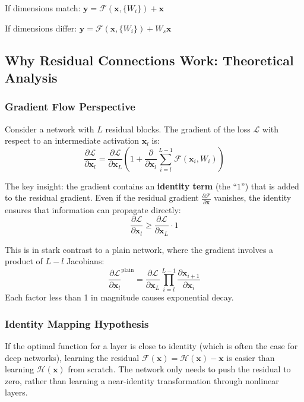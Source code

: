 If dimensions match: $\mathbf{y} = \mathcal{F}(\mathbf{x}, \{W_i\}) + \mathbf{x}$

If dimensions differ: $\mathbf{y} = \mathcal{F}(\mathbf{x}, \{W_i\}) + W_s\mathbf{x}$

\subsection{Why Residual Connections Work: Theoretical Analysis}

\subsubsection{Gradient Flow Perspective}

Consider a network with $L$ residual blocks. The gradient of the loss $\mathcal{L}$ with respect to an intermediate activation $\mathbf{x}_l$ is:
\begin{equation}
\frac{\partial \mathcal{L}}{\partial \mathbf{x}_l} = \frac{\partial \mathcal{L}}{\partial \mathbf{x}_L} \left(1 + \frac{\partial}{\partial \mathbf{x}_l}\sum_{i=l}^{L-1} \mathcal{F}(\mathbf{x}_i, W_i)\right)
\end{equation}

The key insight: the gradient contains an \textbf{identity term} (the ``$1$'') that is added to the residual gradient. Even if the residual gradient $\frac{\partial \mathcal{F}}{\partial \mathbf{x}}$ vanishes, the identity ensures that information can propagate directly:
\begin{equation}
\frac{\partial \mathcal{L}}{\partial \mathbf{x}_l} \geq \frac{\partial \mathcal{L}}{\partial \mathbf{x}_L} \cdot 1
\end{equation}

This is in stark contrast to a plain network, where the gradient involves a product of $L - l$ Jacobians:
\begin{equation}
\frac{\partial \mathcal{L}}{\partial \mathbf{x}_l}^{\text{plain}} = \frac{\partial \mathcal{L}}{\partial \mathbf{x}_L} \prod_{i=l}^{L-1} \frac{\partial \mathbf{x}_{i+1}}{\partial \mathbf{x}_i}
\end{equation}
Each factor less than 1 in magnitude causes exponential decay.

\subsubsection{Identity Mapping Hypothesis}

If the optimal function for a layer is close to identity (which is often the case for deep networks), learning the residual $\mathcal{F}(\mathbf{x}) = \mathcal{H}(\mathbf{x}) - \mathbf{x}$ is easier than learning $\mathcal{H}(\mathbf{x})$ from scratch. The network only needs to push the residual to zero, rather than learning a near-identity transformation through nonlinear layers.

